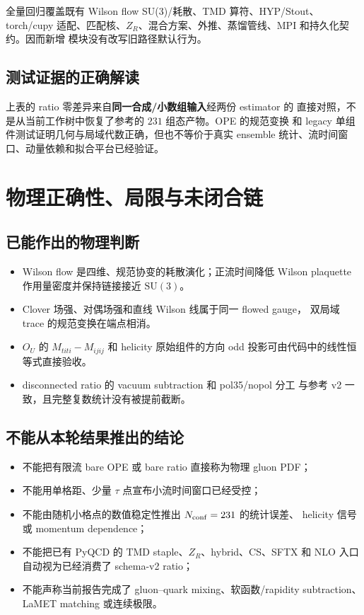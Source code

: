 \documentclass[UTF8,a4paper,11pt]{ctexart}
\newcommand{\SU}{\mathrm{SU}}
\begin{document}
全量回归覆盖既有 Wilson flow SU(3)/耗散、TMD 算符、HYP/Stout、torch/cupy
适配、匹配核、$Z_R$、混合方案、外推、蒸馏管线、MPI 和持久化契约。因而新增
模块没有改写旧路径默认行为。

\subsection{测试证据的正确解读}

上表的 ratio 零差异来自\textbf{同一合成/小数组输入}经两份 estimator 的
直接对照，不是从当前工作树中恢复了参考的 $231$ 组态产物。OPE 的规范变换
和 legacy 单组件测试证明几何与局域代数正确，但也不等价于真实 ensemble
统计、流时间窗口、动量依赖和拟合平台已经验证。

\section{物理正确性、局限与未闭合链}

\subsection{已能作出的物理判断}

\begin{itemize}
  \item Wilson flow 是四维、规范协变的耗散演化；正流时间降低 Wilson
        plaquette 作用量密度并保持链接接近 $\SU(3)$。
  \item Clover 场强、对偶场强和直线 Wilson 线属于同一 flowed gauge，
        双局域 trace 的规范变换在端点相消。
  \item $O_U$ 的 $M_{titi}-M_{ijij}$ 和 helicity 原始组件的方向 odd
        投影可由代码中的线性恒等式直接验收。
  \item disconnected ratio 的 vacuum subtraction 和 pol35/nopol 分工
        与参考 v2 一致，且完整复数统计没有被提前截断。
\end{itemize}

\subsection{不能从本轮结果推出的结论}

\begin{itemize}
  \item 不能把有限流 bare OPE 或 bare ratio 直接称为物理 gluon PDF；
  \item 不能用单格距、少量 $\tau$ 点宣布小流时间窗口已经受控；
  \item 不能由随机小格点的数值稳定性推出 $N_{\rm conf}=231$ 的统计误差、
        helicity 信号或 momentum dependence；
  \item 不能把已有 PyQCD 的 TMD staple、$Z_R$、hybrid、CS、SFTX 和 NLO
        入口自动视为已经消费了 schema-v2 ratio；
  \item 不能声称当前报告完成了 gluon--quark mixing、软函数/rapidity
        subtraction、LaMET matching 或连续极限。
\end{itemize}
\end{document}
